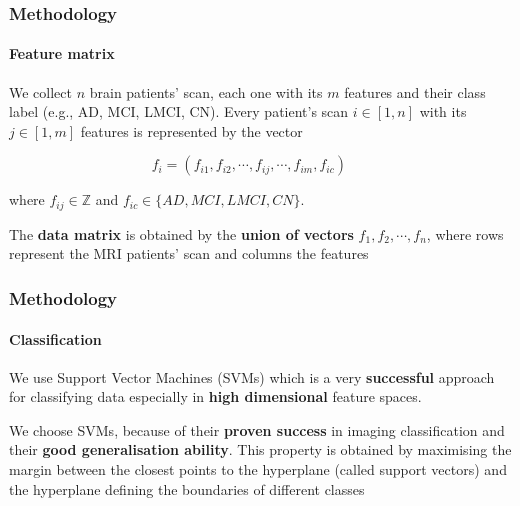 \begin{frame}
	\frametitle{Methodology}
	\framesubtitle{Feature matrix}
	
	\Large
	
	\vspace{0.3cm}
	
	We collect $ n $ brain patients' scan, each one with its $ m $ features and their class label
	(e.g., AD, MCI, LMCI, CN). Every patient's scan $ i \in [1,n] $ with its $j \in [1,m] $ features is
	represented by the vector
	
	\vspace{-0.5cm}
	
	\begin{equation*}
		f_i =(f_{i1}, f_{i2}, \cdots, f_{ij}, \cdots, f_{im}, f_{ic}) \;\;\;\;\;\; 
	\end{equation*}

	where $ f_{ij} \in \mathbb{Z} $ and $ f_{ic} \in {\{AD, MCI, LMCI, CN\}} $.
	
	\vspace{0.3cm}
	
	The \textbf{data matrix} is obtained by the \textbf{union of vectors} $ f_1, f_2, \cdots, f_n $,
	where rows represent the MRI patients' scan and columns the features
\end{frame}

\begin{frame}
	\frametitle{Methodology}
	\framesubtitle{Classification}
	
	\Large
	
	\vspace{0.3cm}
	
	We use Support Vector Machines (SVMs) which is a very \textbf{successful} approach for classifying
	data especially in \textbf{high dimensional} feature spaces.
	
	\vspace{0.3cm}
	
	We choose SVMs, because of their \textbf{proven success} in imaging classification and their
	\textbf{good generalisation ability}. This property is obtained by maximising the margin between
	the closest points to the hyperplane (called support vectors) and the hyperplane defining the
	boundaries of different classes
\end{frame}

